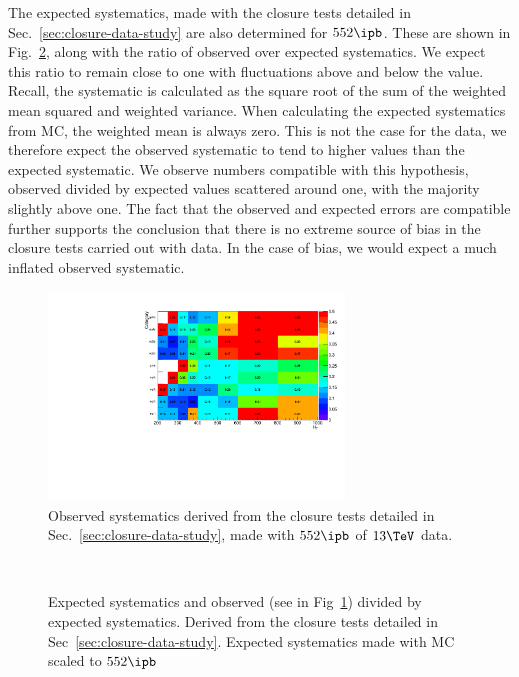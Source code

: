 The expected systematics, made with the
closure tests detailed in Sec.~\ref{sec:closure-data-study} are also
determined for $552\ipb$. These are shown in
Fig.~\ref{fig:systematicsExp}, along with the ratio of observed over
expected systematics. We expect this ratio to remain close to one with
fluctuations above and below the value. Recall, the
systematic is calculated as the square root of the sum of the weighted
mean squared and weighted variance. When calculating the expected
systematics from MC, the weighted mean is always zero. This is not the
case for the data, we therefore expect the observed systematic to
tend to higher values than the expected systematic. We observe numbers
compatible with this hypothesis, observed divided by expected values
scattered around one, with the majority slightly above one. The fact
that the observed and expected errors are compatible further supports
the conclusion that there is no extreme source of bias in the closure
tests carried out with data. In the case of bias, we would expect a
much inflated observed systematic.

\begin{figure}[]
  \centering
  \includegraphics[width=0.7\textwidth]{figures/closureTests/552pb/obs2D.pdf}
  \caption{\label{fig:systematicsObs} Observed systematics derived from
  the closure tests detailed in Sec.~\ref{sec:closure-data-study}, made with $552\ipb$ of $13\tev$ data.}
\end{figure}

\begin{figure}[]
  \centering
   ~~
  \caption{\label{fig:systematicsExp} Expected systematics and observed
  (see in Fig~\ref{fig:systematicsObs})
  divided by expected systematics. Derived from the closure tests 
  detailed in Sec~\ref{sec:closure-data-study}. Expected systematics made with MC
  scaled to $552\ipb$}
\end{figure}


